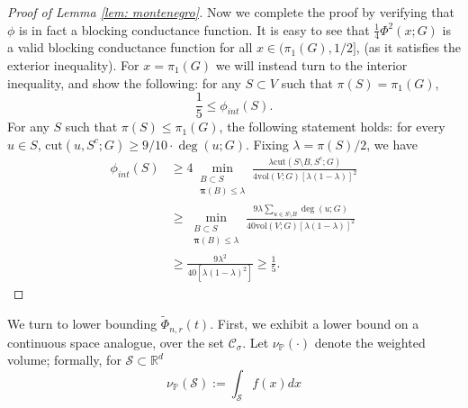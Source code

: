 \documentclass{article}
\newcommand{\vol}{\mathrm{vol}}
\newcommand{\Reals}{\mathbb{R}}
\newcommand{\Rd}{\Reals^d}
\newcommand{\1}{\mathbf{1}}
\newcommand{\cut}{\mathrm{cut}}
\newcommand{\pibf}{\bm{\pi}}
\newcommand{\Pbb}{\mathbb{P}}
\newcommand{\Sset}{\mathcal{S}}
\newcommand{\Cset}{\mathcal{C}}
\newcommand{\Csig}{\Cset_{\sigma}}
\theoremstyle{aldenthm}
\begin{document}
\begin{proof}[Proof of Lemma \ref{lem: montenegro}]
	Now we complete the proof by verifying that $\phi$ is in fact a blocking conductance function. It is easy to see that $\frac{1}{4} \Phi^2(x;G)$ is a valid blocking conductance function for all $x \in (\pi_1(G), 1/2]$, (as it satisfies the exterior inequality). For $x = \pi_1(G)$ we will instead turn to the interior inequality, and show the following: for any $S \subset V$ such that $\pi(S) = \pi_1(G)$, 
	\begin{equation*}
	\frac{1}{5} \leq \phi_{int}(S).
	\end{equation*}
	For any $S$ such that $\pi(S) \leq \pi_1(G)$, the following statement holds: for every $u \in S$, $\cut(u, S^c; G) \geq 9/10 \cdot \deg(u; G)$. 
	Fixing $\lambda = \pi(S)/2$, we have
	\begin{align*}
	\phi_{int}(S) & \geq 4 \min_{\substack{B \subset S \\ \pibf(B) \leq \lambda} } \frac{\lambda \cut(S \setminus B, S^c; G)}{4 \vol(V; G) \left[\lambda (1 - \lambda)\right]^2} \\
	& \geq  \min_{\substack{B \subset S \\ \pibf(B) \leq \lambda} } \frac{9 \lambda \sum_{u \in S \setminus B} \deg(u; G)}{40 \vol(V; G) \left[\lambda (1 - \lambda)\right]^2} \\
	& \geq \frac{9\lambda^2}{40[\lambda(1 - \lambda)^2]} \geq \frac{1}{5}. 
	\end{align*} 
\end{proof}

We turn to lower bounding $\widetilde{\Phi}_{n,r}(t)$. First, we exhibit a lower bound on a continuous space analogue, over the set $\Csig$. Let $\nu_{\Pbb}(\cdot)$ denote the weighted volume; formally, for $\Sset \subset \Rd$
\begin{equation*}
\nu_{\Pbb}(\Sset) := \int_{\Sset} f(x) dx
\end{equation*} 
 
\end{document}
